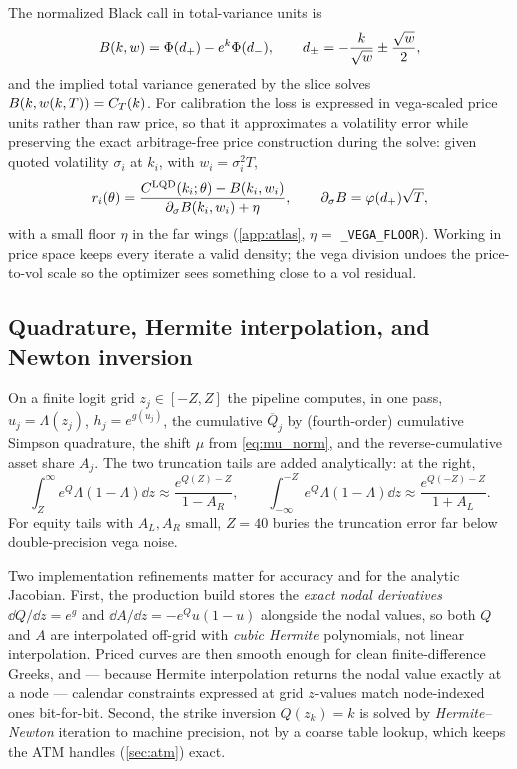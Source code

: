 \documentclass[11pt]{article}
\begin{document}
The normalized Black call in total-variance units is
\begin{equation}
B(k,w)=\Phi(d_+)-e^{k}\Phi(d_-),\qquad
d_\pm=-\frac{k}{\sqrt w}\pm\frac{\sqrt w}{2},
\label{eq:black}
\end{equation}
and the implied total variance generated by the slice solves
$B(k,w(k,T))=C_T(k)$. For calibration the loss is expressed in vega-scaled
price units rather than raw price, so that it approximates a volatility error
while preserving the exact arbitrage-free price construction during the solve:
given quoted volatility $\sigma_i$ at $k_i$, with $w_i=\sigma_i^2T$,
\begin{equation}
r_i(\theta)=\frac{C^{\mathrm{LQD}}(k_i;\theta)-B(k_i,w_i)}{\partial_\sigma B(k_i,w_i)+\eta},
\qquad \partial_\sigma B=\varphi(d_+)\sqrt T,
\label{eq:vega_resid}
\end{equation}
with a small floor $\eta$ in the far wings (\cref{app:atlas}, $\eta=$
\texttt{\_VEGA\_FLOOR}). Working in price space keeps every iterate a valid
density; the vega division undoes the price-to-vol scale so the optimizer sees
something close to a vol residual.

\subsection{Quadrature, Hermite interpolation, and Newton inversion}
\label{sec:quadrature}

On a finite logit grid $z_j\in[-Z,Z]$ the pipeline computes, in one pass,
$u_j=\Lambda(z_j)$, $h_j=e^{g(u_j)}$, the cumulative $\overline Q_j$ by
(fourth-order) cumulative Simpson quadrature, the shift $\mu$ from
\eqref{eq:mu_norm}, and the reverse-cumulative asset share $A_j$. The two
truncation tails are added analytically: at the right,
\begin{equation}
\int_Z^{\infty}e^{Q}\Lambda(1-\Lambda)\dd z\approx\frac{e^{Q(Z)-Z}}{1-A_R},
\qquad
\int_{-\infty}^{-Z}e^{Q}\Lambda(1-\Lambda)\dd z\approx\frac{e^{Q(-Z)-Z}}{1+A_L}.
\label{eq:tail_corr}
\end{equation}
For equity tails with $A_L,A_R$ small, $Z=40$ buries the truncation error far
below double-precision vega noise.

Two implementation refinements matter for accuracy and for the analytic
Jacobian. First, the production build stores the \emph{exact nodal derivatives}
$\dd Q/\dd z=e^{g}$ and $\dd A/\dd z=-e^{Q}u(1-u)$ alongside the nodal values, so
both $Q$ and $A$ are interpolated off-grid with \emph{cubic Hermite}
polynomials, not linear interpolation. Priced curves are then smooth enough for
clean finite-difference Greeks, and --- because Hermite interpolation returns the
nodal value exactly at a node --- calendar constraints expressed at grid
$z$-values match node-indexed ones bit-for-bit. Second, the strike inversion
$Q(z_k)=k$ is solved by \emph{Hermite--Newton} iteration to machine precision,
not by a coarse table lookup, which keeps the ATM handles (\cref{sec:atm})
exact.
\end{document}
